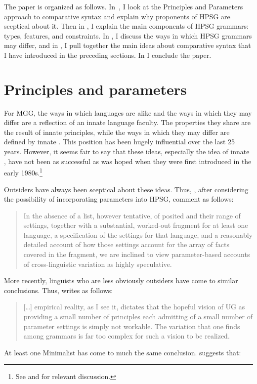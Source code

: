 \documentclass[output=paper]{langsci/langscibook}
\begin{document}
The paper is organized as follows. In~, I look at the Principles
and Parameters approach to comparative syntax and explain why proponents of
\gls{HPSG} are sceptical about it. Then in , I explain the main
components of \gls{HPSG} grammars: types, features, and constraints. In
, I discuss the ways in which \gls{HPSG} grammars may differ, and
in , I pull together the main ideas about comparative syntax that
I have introduced in the preceding sections. In  I
conclude the paper.

\section{Principles and parameters}\label{sec-5:2}

For \gls{MGG}, the ways in which languages are alike and the ways in which they
may differ are a reflection of an innate language faculty. The properties they
share are the result of innate principles, while the ways in which they may
differ are defined by innate . This position has been hugely
influential over the last 25 years. However, it seems fair to say that these
ideas, especially the idea of innate , have not been as successful as
was hoped when they were first introduced in the early 1980s.\footnote{See
\citet{Newmeyer2005} and \citet{Haspelmath2008} for relevant discussion.}

Outsiders have always been sceptical about these ideas. Thus,
\citet[31]{PolSag1994}, after considering the possibility of incorporating
parameters into \gls{HPSG}, comment as
follows:

\blockquote{In the absence of a list, however tentative, of posited
     and their range of settings, together with a substantial,
    worked-out fragment for at least one language, a specification of the
    settings for that language, and a reasonably detailed account of how those
settings account for the array of facts covered in the fragment, we are
inclined to view parameter-based accounts of cross-linguistic variation as
highly speculative.}
%
More recently, linguists who are less obviously outsiders have come to similar
conclusions. Thus, \citet[75]{Newmeyer2005} writes as follows:

\blockquote{[\dots{}] empirical reality, as I see it, dictates that the hopeful
    vision of UG as providing a small number of principles each admitting of a
    small number of parameter settings is simply not workable. The variation
    that one finds among grammars is far too complex for such a vision to be
realized.}
%
At least one Minimalist has come to much the same conclusion.
\citet{Boeckx2011b} suggests that:
\end{document}
